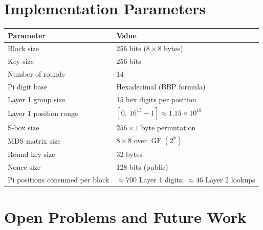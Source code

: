 \documentclass[12pt, a4paper]{article}
\DeclareMathOperator{\GF}{GF}
\begin{document}
\section{Implementation Parameters}

\begin{center}
\renewcommand{\arraystretch}{1.4}
\begin{tabular}{ll}
\toprule
\textbf{Parameter} & \textbf{Value} \\
\midrule
Block size & 256 bits ($8 \times 8$ bytes) \\
Key size & 256 bits \\
Number of rounds & 14 \\
Pi digit base & Hexadecimal (BBP formula) \\
Layer 1 group size & 15 hex digits per position \\
Layer 1 position range & $[0,\ 16^{15} - 1] \approx 1.15 \times 10^{18}$ \\
S-box size & $256 \times 1$ byte permutation \\
MDS matrix size & $8 \times 8$ over $\GF(2^8)$ \\
Round key size & 32 bytes \\
Nonce size & 128 bits (public) \\
Pi positions consumed per block & $\approx 700$ Layer 1 digits; $\approx 46$ Layer 2 lookups \\
\bottomrule
\end{tabular}
\end{center}

\section{Open Problems and Future Work}
\end{document}
